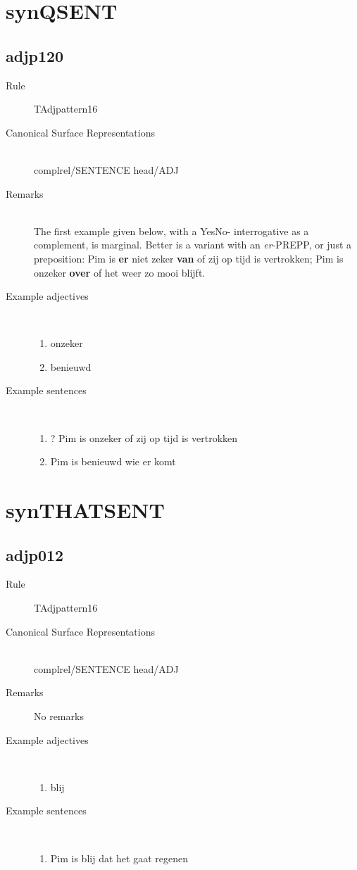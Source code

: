 \section{synQSENT}
  \subsection{adjp120}
\begin{description}
  \item [Rule] TAdjpattern16
  \item [Canonical Surface Representations] \mbox{}\\ complrel/SENTENCE head/ADJ
  \item [Remarks] \mbox{}\\ The first example given below, with a YesNo-
interrogative as a complement, is marginal. Better is a variant
with an {\em er}-PREPP, or just a preposition: Pim is {\bf er} niet zeker 
{\bf van}
of zij op tijd is vertrokken; 
Pim is onzeker {\bf over}  of het weer zo 
mooi blijft. 
  \item [Example adjectives]\mbox{}\\
\begin{enumerate}
  \item onzeker
  \item benieuwd
\end{enumerate}
  \item [Example sentences]\mbox{}\\
\begin{enumerate}
  \item 
? Pim is onzeker of zij op tijd is vertrokken
  \item 
Pim is benieuwd wie er komt
\end{enumerate}
\end{description}
\newpage
\section{synTHATSENT}
  \subsection{adjp012}
\begin{description}
  \item [Rule] TAdjpattern16
  \item [Canonical Surface Representations]\mbox{}\\  complrel/SENTENCE head/ADJ
  \item [Remarks]  No remarks
  \item [Example adjectives]\mbox{}\\
\begin{enumerate}
  \item blij
\end{enumerate}
  \item [Example sentences]\mbox{}\\
\begin{enumerate}
  \item Pim is blij dat het gaat regenen
\end{enumerate}
\end{description}
\newpage
